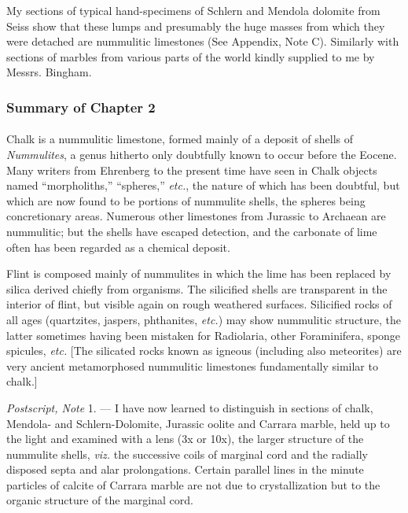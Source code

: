\documentclass[a4paper, 12pt, oneside]{article}
\begin{document}
My sections of typical hand-specimens of Schlern and Mendola dolomite from Seiss show that these lumps and presumably the huge masses from which they were detached are nummulitic limestones (See Appendix, Note C). Similarly with sections of marbles from various parts of the world kindly supplied to me by Messrs. Bingham.

\subsubsection{Summary of Chapter 2}
\paragraph{}
Chalk is a nummulitic limestone, formed mainly of a deposit of shells of \emph{Nummulites}, a genus hitherto only doubtfully known to occur before the Eocene. Many writers from Ehrenberg to the present time have seen in Chalk objects named ``morpholiths,'' ``spheres,'' \emph{etc.}, the nature of which has been doubtful, but which are now found to be portions of nummulite shells, the spheres being concretionary areas. Numerous other limestones from Jurassic to Archaean are nummulitic; but the shells have escaped detection, and the carbonate of lime often has been regarded as a chemical deposit.

Flint is composed mainly of nummulites in which the lime has been replaced by silica derived chiefly from organisms. The silicified shells are transparent in the interior of flint, but visible again on rough weathered surfaces. Silicified rocks of all ages (quartzites, jaspers, phthanites, \emph{etc.}) may show nummulitic structure, the latter sometimes having been mistaken for Radiolaria, other Foraminifera, sponge spicules, \emph{etc.} [The silicated rocks known as igneous (including also meteorites) are very ancient metamorphosed nummulitic limestones fundamentally similar to chalk.]

\emph{Postscript, Note} 1. --- I have now learned to distinguish in sections of chalk, Mendola- and Schlern-Dolomite, Jurassic oolite and Carrara marble, held up to the light and examined with a lens (3x or 10x), the larger structure of the nummulite shells, \emph{viz.} the successive coils of marginal cord and the radially disposed septa and alar prolongations. Certain parallel lines in the minute particles of calcite of Carrara marble are not due to crystallization but to the organic structure of the marginal cord.
\end{document}
